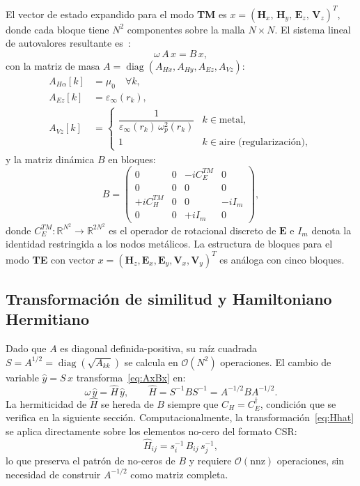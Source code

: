 \documentclass[12pt,a4paper]{article}
\newcommand{\R}{\mathbb{R}}
\newcommand{\Hhat}{\hat{H}}
\newcommand{\isqA}{A^{-1/2}}
\newcommand{\omegap}{\omega_p}
\newcommand{\epsinf}{\varepsilon_\infty}
\newcommand{\vect}[1]{\bm{#1}}
\DeclareMathOperator{\diag}{diag}
\begin{document}
El vector de estado expandido para el modo \textbf{TM} es
$x = (\vect{H}_x,\, \vect{H}_y,\, \vect{E}_z,\, \vect{V}_z)^T$,
donde cada bloque tiene $N^2$ componentes sobre la malla $N\times N$.
El sistema lineal de autovalores resultante es~\cite{Raman2010}:
\begin{equation}
  \omega\, A\, x = B\, x,
  \label{eq:AxBx}
\end{equation}
con la matriz de masa $A = \diag(A_{Hx}, A_{Hy}, A_{Ez}, A_{Vz})$:
\begin{align}
  A_{H\alpha}[k] &= \mu_0 \quad \forall k, \\
  A_{Ez}[k]      &= \epsinf(r_k), \\
  A_{Vz}[k]      &=
    \begin{cases}
      \dfrac{1}{\epsinf(r_k)\,\omegap^2(r_k)} & k \in \text{metal},\\[6pt]
      1 & k \in \text{aire (regularización)},
    \end{cases}
  \label{eq:A_diag}
\end{align}
y la matriz dinámica $B$ en bloques:
\begin{equation}
  B =
  \begin{pmatrix}
    0      &  0      & -i C_E^{TM} & 0  \\
    0      &  0      &     0       & 0  \\
    +i C_H^{TM} & 0  &  0         & -i I_m \\
    0      &  0      & +i I_m      &  0
  \end{pmatrix},
  \label{eq:B_TM}
\end{equation}
donde $C_E^{TM}: \R^{N^2}\to\R^{2N^2}$ es el operador de rotacional
discreto de $\vect{E}$ e $I_m$ denota la identidad restringida a los
nodos metálicos.
La estructura de bloques para el modo \textbf{TE} con vector
$x=(\vect{H}_z, \vect{E}_x, \vect{E}_y, \vect{V}_x, \vect{V}_y)^T$
es análoga con cinco bloques.

\subsection{Transformación de similitud y Hamiltoniano Hermitiano}

Dado que $A$ es diagonal definida-positiva, su raíz cuadrada
$S = A^{1/2} = \diag(\sqrt{A_{kk}})$ se calcula en $\mathcal{O}(N^2)$
operaciones.
El cambio de variable $\hat{y} = S\, x$ transforma~\eqref{eq:AxBx} en:
\begin{equation}
  \omega\,\hat{y} = \Hhat\,\hat{y},
  \qquad
  \Hhat = S^{-1} B S^{-1} = \isqA B \isqA.
  \label{eq:Hhat}
\end{equation}
La hermiticidad de $\Hhat$ se hereda de $B$ siempre que $C_H = C_E^\dagger$,
condición que se verifica en la siguiente sección.
Computacionalmente, la transformación~\eqref{eq:Hhat} se aplica
directamente sobre los elementos no-cero del formato CSR:
\begin{equation}
  \Hhat_{ij} = s^{-1}_i\, B_{ij}\, s^{-1}_j,
  \label{eq:similarity_sparse}
\end{equation}
lo que preserva el patrón de no-ceros de $B$ y requiere $\mathcal{O}(\text{nnz})$
operaciones, sin necesidad de construir $A^{-1/2}$ como matriz completa.
\end{document}
